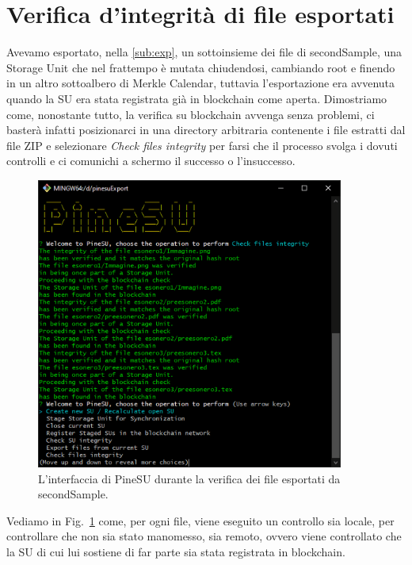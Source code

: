 \section{Verifica d'integrità di file esportati}
Avevamo esportato, nella \autoref{sub:exp}, un sottoinsieme dei file di \textsf{secondSample},
una Storage Unit che nel frattempo è mutata chiudendosi, cambiando root e finendo in un
altro sottoalbero di Merkle Calendar, tuttavia l'esportazione era avvenuta quando la SU
era stata registrata già in blockchain come aperta.
Dimostriamo come, nonostante tutto, la verifica su blockchain avvenga senza problemi,
ci basterà infatti posizionarci in una directory arbitraria contenente i file estratti
dal file ZIP e selezionare \emph{Check files integrity} per farsi che il processo svolga i
dovuti controlli e ci comunichi a schermo il successo o l'insuccesso.

\begin{figure}[H]
    \centering
    \includegraphics[width=0.9\textwidth]{Figures/verifyFiles}
    \caption{\small{
    L'interfaccia di PineSU durante la verifica dei file esportati da \textsf{secondSample}.
    } %
    } %
    \label{fi:vfil}
\end{figure}

Vediamo in Fig.~\ref{fi:vfil} come, per ogni file, viene eseguito un controllo sia locale,
per controllare che non sia stato manomesso, sia remoto, ovvero viene controllato che la SU
di cui lui sostiene di far parte sia stata registrata in blockchain.
